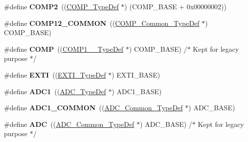 \begin{DoxyCompactItemize}
\#define {\bfseries C\+O\+M\+P2}~((\hyperlink{struct_c_o_m_p___type_def}{C\+O\+M\+P\+\_\+\+Type\+Def} $\ast$) (C\+O\+M\+P\+\_\+\+B\+A\+SE + 0x00000002))
\item 
\mbox{\label{group___peripheral__declaration_ga7c0dbc759386dc94597d1ab7b798e75f}} 
\#define {\bfseries C\+O\+M\+P12\+\_\+\+C\+O\+M\+M\+ON}~((\hyperlink{struct_c_o_m_p___common___type_def}{C\+O\+M\+P\+\_\+\+Common\+\_\+\+Type\+Def} $\ast$) C\+O\+M\+P\+\_\+\+B\+A\+SE)
\item 
\mbox{\label{group___peripheral__declaration_ga076912543697dbe4c46b79e8e44ad2fb}} 
\#define {\bfseries C\+O\+MP}~((\hyperlink{struct_c_o_m_p1__2___type_def}{C\+O\+M\+P1\+\_\+\_\+\+Type\+Def} $\ast$) C\+O\+M\+P\+\_\+\+B\+A\+SE) /$\ast$ Kept for legacy purpose $\ast$/
\item 
\mbox{\label{group___peripheral__declaration_ga9189e770cd9b63dadd36683eb9843cac}} 
\#define {\bfseries E\+X\+TI}~((\hyperlink{struct_e_x_t_i___type_def}{E\+X\+T\+I\+\_\+\+Type\+Def} $\ast$) E\+X\+T\+I\+\_\+\+B\+A\+SE)
\item 
\mbox{\label{group___peripheral__declaration_ga90d2d5c526ce5c0a551f533eccbee71a}} 
\#define {\bfseries A\+D\+C1}~((\hyperlink{struct_a_d_c___type_def}{A\+D\+C\+\_\+\+Type\+Def} $\ast$) A\+D\+C1\+\_\+\+B\+A\+SE)
\item 
\mbox{\label{group___peripheral__declaration_gaf1919c64fc774aab31190346fd5457e2}} 
\#define {\bfseries A\+D\+C1\+\_\+\+C\+O\+M\+M\+ON}~((\hyperlink{struct_a_d_c___common___type_def}{A\+D\+C\+\_\+\+Common\+\_\+\+Type\+Def} $\ast$) A\+D\+C\+\_\+\+B\+A\+SE)
\item 
\mbox{\label{group___peripheral__declaration_ga54d148b91f3d356713f7e367a2243bea}} 
\#define {\bfseries A\+DC}~((\hyperlink{struct_a_d_c___common___type_def}{A\+D\+C\+\_\+\+Common\+\_\+\+Type\+Def} $\ast$) A\+D\+C\+\_\+\+B\+A\+SE) /$\ast$ Kept for legacy purpose $\ast$/
\item 
\mbox{\label{group___peripheral__declaration_ga2e87451fea8dc9380056d3cfc5ed81fb}} 

\end{DoxyCompactItemize}
